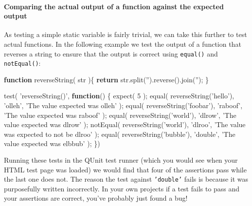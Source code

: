 \documentclass[9pt]{book}
\newenvironment{Shaded}{}{}
\newcommand{\KeywordTok}[1]{\textcolor[rgb]{0.00,0.44,0.13}{\textbf{{#1}}}}
\newcommand{\DecValTok}[1]{\textcolor[rgb]{0.25,0.63,0.44}{{#1}}}
\newcommand{\StringTok}[1]{\textcolor[rgb]{0.25,0.44,0.63}{{#1}}}
\newcommand{\OtherTok}[1]{\textcolor[rgb]{0.00,0.44,0.13}{{#1}}}
\newcommand{\FunctionTok}[1]{\textcolor[rgb]{0.02,0.16,0.49}{{#1}}}
\newcommand{\NormalTok}[1]{{#1}}
\begin{document}
\paragraph{Comparing the actual output of a function against the
expected
output}\label{comparing-the-actual-output-of-a-function-against-the-expected-output}

As testing a simple static variable is fairly trivial, we can take this
further to test actual functions. In the following example we test the
output of a function that reverses a string to ensure that the output is
correct using \texttt{equal()} and \texttt{notEqual()}:

\begin{Shaded}
\begin{Highlighting}[]
\KeywordTok{function} \FunctionTok{reverseString}\NormalTok{( str )\{}
    \KeywordTok{return} \OtherTok{str}\NormalTok{.}\FunctionTok{split}\NormalTok{(}\StringTok{''}\NormalTok{).}\FunctionTok{reverse}\NormalTok{().}\FunctionTok{join}\NormalTok{(}\StringTok{''}\NormalTok{);}
\NormalTok{\}}

\FunctionTok{test}\NormalTok{( }\StringTok{'reverseString()'}\NormalTok{, }\KeywordTok{function}\NormalTok{() \{}
    \FunctionTok{expect}\NormalTok{( }\DecValTok{5} \NormalTok{);}
    \FunctionTok{equal}\NormalTok{( }\FunctionTok{reverseString}\NormalTok{(}\StringTok{'hello'}\NormalTok{), }\StringTok{'olleh'}\NormalTok{, }\StringTok{'The value expected was olleh'} \NormalTok{);}
    \FunctionTok{equal}\NormalTok{( }\FunctionTok{reverseString}\NormalTok{(}\StringTok{'foobar'}\NormalTok{), }\StringTok{'raboof'}\NormalTok{, }\StringTok{'The value expected was raboof'} \NormalTok{);}
    \FunctionTok{equal}\NormalTok{( }\FunctionTok{reverseString}\NormalTok{(}\StringTok{'world'}\NormalTok{), }\StringTok{'dlrow'}\NormalTok{, }\StringTok{'The value expected was dlrow'} \NormalTok{);}
    \FunctionTok{notEqual}\NormalTok{( }\FunctionTok{reverseString}\NormalTok{(}\StringTok{'world'}\NormalTok{), }\StringTok{'dlroo'}\NormalTok{, }\StringTok{'The value was expected to not be dlroo'} \NormalTok{);}
    \FunctionTok{equal}\NormalTok{( }\FunctionTok{reverseString}\NormalTok{(}\StringTok{'bubble'}\NormalTok{), }\StringTok{'double'}\NormalTok{, }\StringTok{'The value expected was elbbub'} \NormalTok{);}
\NormalTok{\})}
\end{Highlighting}
\end{Shaded}

Running these tests in the QUnit test runner (which you would see when
your HTML test page was loaded) we would find that four of the
assertions pass while the last one does not. The reason the test against
\texttt{'double'} fails is because it was purposefully written
incorrectly. In your own projects if a test fails to pass and your
assertions are correct, you've probably just found a bug!
\end{document}
